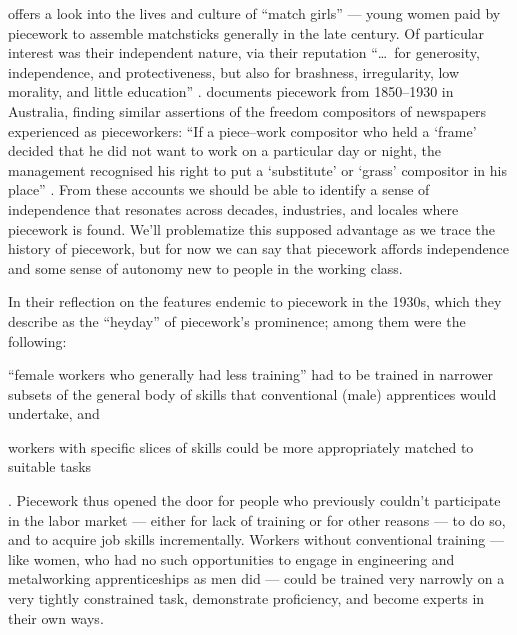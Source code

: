 \documentclass[trackingWork]{subfiles}
\begin{document}
\citeauthor{10.2307/3827491} offers a look into the lives and culture of ``match girls''
--- young women paid by piecework to assemble matchsticks generally in the late  century.
Of particular interest was their independent nature, via their reputation ``\dots~for generosity, independence, and protectiveness,
but also for brashness, irregularity, low morality, and little education''
\cite{10.2307/3827491}.
\citeauthor{10.2307/27508091} documents piecework from 1850--1930 in Australia,
finding similar assertions of the freedom compositors of newspapers experienced as pieceworkers:
``If a piece--work compositor who held a `frame' decided that he did not want to work on a particular day or night,
the management recognised his right to put a `substitute' or `grass' compositor in his place''
\cite{10.2307/27508091}.
From these accounts we should be able to identify
a sense of independence that
resonates across decades, industries, and locales where piecework is found.
We'll problematize this supposed advantage as we trace the history of piecework,
but for now we can say that piecework affords
independence and some sense of autonomy
new to people in the working class.


In their reflection on the features endemic to piecework in the 1930s,
which they describe as the ``heyday'' of piecework's prominence;
among them were the following:
\begin{inlinelist}
  \item ``female workers who generally had less training'' had to be trained in
        narrower subsets of the general body of skills that
        conventional (male) apprentices would undertake, and
  \item workers with specific slices of skills could be more appropriately matched to
        suitable tasks
\end{inlinelist}
\cite{hart2013rise}.
Piecework thus opened the door for people who previously couldn't participate in the labor market
--- either for lack of training or for other reasons ---
to do so, and to acquire job skills incrementally.
Workers without conventional training
--- like women, who had no such opportunities
to engage in engineering and metalworking apprenticeships as men did ---
could be trained very narrowly on a very tightly constrained task,
demonstrate proficiency, and become experts in their own ways.
\end{document}
